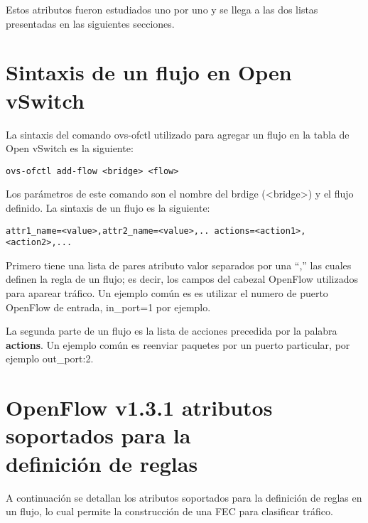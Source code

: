 Estos atributos fueron estudiados uno por uno y se llega a las dos listas presentadas en las siguientes secciones.\\

\section{Sintaxis de un flujo en Open vSwitch}
La sintaxis del comando ovs-ofctl utilizado para agregar un flujo en la tabla de Open vSwitch es la siguiente:


\begin{center}
\texttt{ovs-ofctl add-flow <bridge> <flow>}
\end{center}

Los parámetros de este comando son el nombre del brdige (<bridge>) y el flujo definido. La sintaxis de un flujo es la siguiente:

\begin{center}
\texttt{attr1\_name=<value>,attr2\_name=<value>,.. actions=<action1>,<action2>,...}
\end{center}

Primero tiene una lista de pares atributo valor separados por una “,” las cuales definen la regla de un flujo; es decir, los campos del cabezal OpenFlow utilizados para aparear tr\'afico. Un ejemplo común es es utilizar el numero de puerto OpenFlow de entrada, in\_port=1 por ejemplo.

La segunda parte de un flujo es la lista de acciones precedida por la palabra \textbf{actions}. Un ejemplo común es reenviar paquetes por un puerto particular, por ejemplo out\_port:2. 
 
\section{OpenFlow v1.3.1 atributos soportados para la \\ definici\'on de reglas}

A continuaci\'on se detallan los atributos soportados para la definici\'on de reglas en un flujo, lo cual permite la construcci\'on de una FEC para clasificar tr\'afico.

